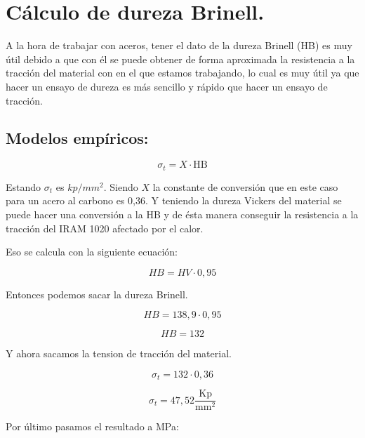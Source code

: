\documentclass[12pt,a4paper]{article}
\begin{document}
\section{Cálculo de dureza Brinell.}

A la hora de trabajar con aceros, tener el dato de la dureza Brinell (HB) es muy útil debido a que con él se puede obtener de forma aproximada la resistencia a la tracción del material con en el que estamos trabajando, 
lo cual es muy útil ya que hacer un ensayo de dureza es más sencillo y rápido que hacer un ensayo de tracción.

\subsection{Modelos empíricos:}

\begin{equation}
    \sigma_t = X \cdot \text{HB}
\end{equation}

Estando $\sigma_t$ es $kp/mm^2$. Siendo $X$ la constante de conversión que en este caso para un acero al carbono es 0,36. Y teniendo la dureza Vickers del material se puede hacer una conversión a la HB y de ésta manera conseguir la resistencia a la tracción del IRAM 1020 afectado por el calor.

Eso se calcula con la siguiente ecuación:

\begin{equation}
    HB = HV \cdot 0,95
\end{equation}

Entonces podemos sacar la dureza Brinell.

\begin{equation}
    HB = 138,9 \cdot 0,95
\end{equation}

\begin{equation}
    HB = 132
\end{equation}

Y ahora sacamos la tension de tracción del material.

\begin{equation}
    \sigma_t = 132 \cdot 0,36
\end{equation}

\begin{equation}
    \sigma_t = 47,52 \frac{\text{Kp}}{\text{mm}^2}
\end{equation}

Por último pasamos el resultado a \si{\mega\pascal}:
\end{document}
